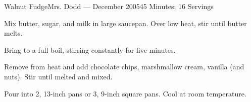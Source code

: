 \documentclass{article}
\begin{document}
\begin{recipe}{Walnut Fudge}{Mrs. Dodd --- December 2005}{45 Minutes; 16 Servings}

   Mix butter, sugar, and milk in large saucepan.  Over low heat, stir until
   butter melts.  

   \newstep
   Bring to a full boil, stirring constantly for five minutes.

   Remove from heat and add chocolate chips, marshmallow cream, vanilla (and
   nuts).  Stir until melted and mixed.

   \newstep
   Pour into 2, 13-inch pans or 3, 9-inch square pans.  Cool at room
   temperature.

\end{recipe}

\end{document}
